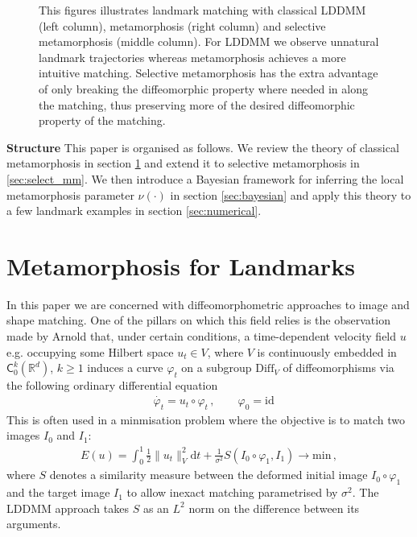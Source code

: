 \documentclass[runningheads]{llncs}
\newcommand{\half}{\frac 12}
\newcommand{\norm}[2]{\| #1 \|_{ #2 }}
\newcommand{\vnorm}[1]{\norm{ #1 }{V}}
\newcommand{\diff}[1]{\text{d} #1}
\newcommand{\Rd}{\mathbb{R}^{d}}
\begin{document}
\begin{figure}
\begin{minipage}{\textwidth}
    \caption{This figures illustrates landmark matching with classical LDDMM
    (left column), metamorphosis (right column) and selective metamorphosis (middle
    column). For LDDMM we observe unnatural landmark trajectories whereas
    metamorphosis achieves a more intuitive matching. Selective metamorphosis
    has the extra advantage of only breaking the diffeomorphic property where
    needed in along the matching, thus preserving more of the desired
    diffeomorphic property of the matching.}
    \label{fig:mm_lddmm}
\end{minipage}
\end{figure}

{\bf Structure} This paper is organised as follows. We review the theory of
classical metamorphosis in section \ref{sec:bg} and extend it to selective
metamorphosis in \ref{sec:select_mm}.  We then introduce a Bayesian framework
for inferring the local metamorphosis parameter $\nu(\cdot)$ in section
\ref{sec:bayesian} and apply this theory to a few landmark examples in section
\ref{sec:numerical}.

\section{Metamorphosis for Landmarks}\label{sec:bg}

In this paper we are concerned with diffeomorphometric approaches to image and
shape matching. One of the pillars on which this field relies is the observation
made by Arnold \cite{arnold1966geometrie} that, under certain conditions, a
time-dependent velocity field $u$ e.g. occupying some Hilbert space $u_t \in V$,
where $V$ is continuously embedded in $\textsf{C}_0^k(\Rd)$, $k\geq 1$ induces a
curve $\varphi_t$ on a subgroup $\text{Diff}_V$ of diffeomorphisms
\cite{younes2010shapes} via the following ordinary differential equation
\begin{align}
& \dot{\varphi_t} = u_t \circ \varphi_t\, , \qquad  \varphi_0 = \text{id}
  \label{diffeo}
\end{align}
This is often used in a minmisation problem where the objective is to match two
images $I_0$ and $I_1$:
\begin{align}
  E(u) = \int_0^1 \half\vnorm{u_t}^2 \diff{t} + \frac{1}{\sigma^2}
  S(I_0\circ\varphi_1, I_1)\longrightarrow \text{min}\, , \label{E-def}
\end{align}
where $S$ denotes a similarity measure between the deformed initial image
$I_0\circ \varphi_1$ and the target image $I_1$ to allow inexact matching
parametrised by $\sigma^2$. The LDDMM approach takes $S$ as an $L^2$ norm on
the difference between its arguments.\\
\end{document}
